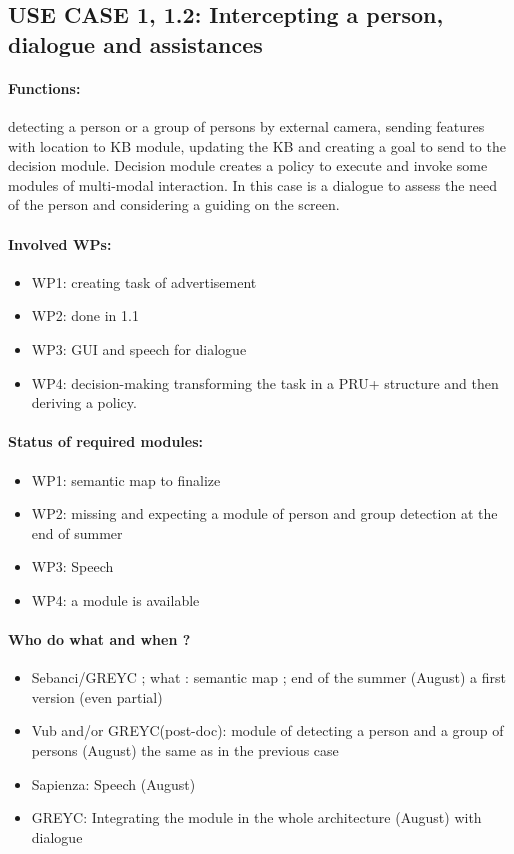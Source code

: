 \documentclass{article}
\begin{document}
\subsection{ USE CASE 1, 1.2: Intercepting a person, dialogue and assistances}
\paragraph{Functions:} detecting a person or a group of persons by external camera, sending features with location to KB module, updating the KB  and creating a goal to send to the decision module. Decision module creates a policy to execute and invoke some modules of multi-modal interaction. In this case is a dialogue to assess the need of the person and considering a guiding on the screen.
\paragraph{\bf Involved WPs:}
\begin{itemize} 
\item  WP1:  creating task of advertisement
\item  WP2: done in 1.1 
\item  WP3: GUI and speech for dialogue
\item  WP4: decision-making transforming the task in a PRU+ structure and then deriving a policy. 
\end{itemize}
\paragraph{Status of required modules:}
\begin{itemize} 
\item WP1: semantic map to finalize
\item WP2: missing and expecting a module of person and group detection at the end of summer
\item WP3: Speech 
\item WP4: a module is available
\end{itemize}
\paragraph{\bf Who do what and when ?} 
\begin{itemize} 
\item Sebanci/GREYC ; what : semantic map ;  end of the summer (August) a first version (even partial)
\item Vub and/or GREYC(post-doc): module of detecting a person and a group of persons (August) the same as in the previous case
 \item Sapienza: Speech (August)
 \item GREYC: Integrating the module in the whole architecture (August) with dialogue
\end{itemize}
\end{document}
